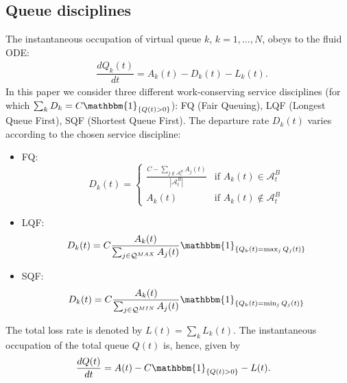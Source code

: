 \documentclass[a4paper,oneside, 11pt]{article}
\newcommand{\I}[1]{  \mathbbm{1}_{ \left\{  #1 \right\} }   }
\newcommand{\A}{ {\mathcal{A}} }
\newcommand{\Q}{ {\mathcal{Q}} }
\begin{document}
\subsection{Queue disciplines}\label{subsec:queues}
The instantaneous occupation of virtual queue $k$, $k=1,\dots,N$, obeys to the fluid ODE:
\begin{align}\label{eqn:ODEqueuek}
&\dfrac{dQ_k(t)}{dt} =A_k(t) - D_k(t) - L_k(t).\end{align}
In this paper we consider three different work-conserving service disciplines (for which $\sum_k D_k = C \I{Q(t) >0}$):
FQ (Fair Queuing), LQF (Longest Queue First), SQF (Shortest Queue First).
The departure rate $D_k(t)$ varies according to the chosen service discipline:
\begin{itemize}
\item FQ:$$D_k(t)=
 \begin{cases}
\frac{C-\sum_{j \notin \A_t^B} A_j(t)} { |\A_t^B|} & \text{if $A_k(t)\in
 \A_t^B$}\\
A_k(t)& \text{if $A_k(t)\notin \A_t^B$}
\end{cases}$$
\item LQF: $$D_k(t)=C \frac{A_k(t)}{\sum_{j \in \Q^{MAX}}A_j(t)}\I{ Q_k(t)=\max_j Q_j(t)}$$
\item SQF:$$D_k(t)=C  \frac{A_k(t)}{\sum_{j \in \Q^{MIN}}A_j(t)}\I{ Q_k(t)=\min_j Q_j(t)}$$
\end{itemize}
The total loss rate is denoted by $L(t)=\sum_k L_k(t)$.	
The instantaneous occupation of the total queue $Q(t)$ is, hence, given by
\begin{align}\label{eqn:ODEqueue}
&\dfrac{dQ(t)}{dt} =A(t) - C\I{Q(t)>0} - L(t).
\end{align}
\end{document}

